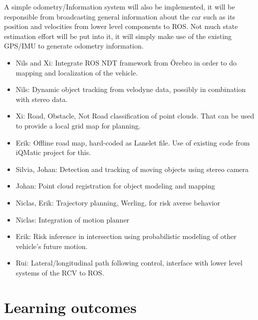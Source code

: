 \documentclass[11pt,a4paper]{article}
\begin{document}
A simple odometry/Information system will also be implemented, it will
be responsible from broadcasting general information about the car
such as its position and velocities from lower level components to
ROS. Not much state estimation effort will be put into it, it will
simply make use of the existing GPS/IMU to generate odometry
information.

\begin{itemize}
\item 
Nils and Xi: Integrate ROS NDT framework from Örebro in order to do
mapping and localization of the vehicle.

\item 
Nils: Dynamic object tracking from velodyne data, possibly in
combination with stereo data.

\item 
Xi: Road, Obstacle, Not Road classification of point clouds. That
can be used to provide a local grid map for planning.

\item 
Erik: Offline road map, hard-coded as Lanelet file. Use of existing
code from iQMatic project for this.

\item 
Silvia, Johan: Detection and tracking of moving objects using stereo
camera

\item 
Johan: Point cloud registration for object modeling and mapping

\item 
Niclas, Erik: Trajectory planning, Werling, for risk averse behavior

\item 
Niclas: Integration of motion planner

\item 
Erik: Risk inference in intersection using probabilistic modeling of
other vehicle's future motion.

\item 
Rui: Lateral/longitudinal path following control, interface with
lower level systems of the RCV to ROS.

\end{itemize}

\section{Learning outcomes}
\end{document}
